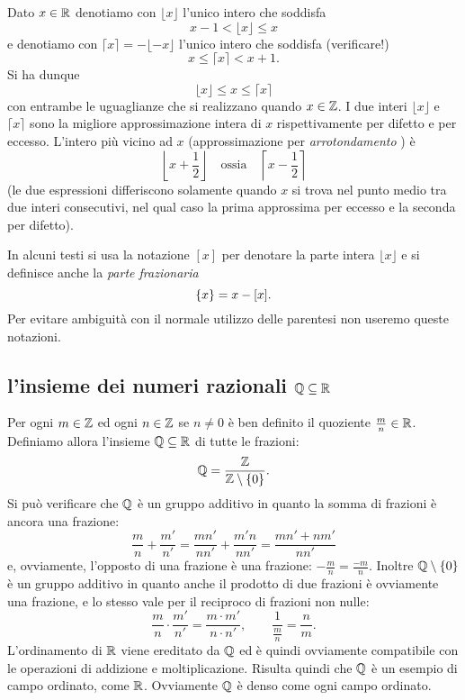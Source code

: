 \begin{definition}
  \mymark{**}%
%
  Dato $x\in {\mathbb R}$ denotiamo con $\lfloor x\rfloor$ l'unico intero
  che soddisfa
  \mymargin{$\lfloor\cdot\rfloor$} %
  \[
    x - 1 < \lfloor x \rfloor \le x
  \]
  e denotiamo con $\lceil x \rceil = - \lfloor -x \rfloor$ l'unico intero che soddisfa (verificare!)
  \mymargin{$\lceil\cdot\rceil$} %
  \[
    x \le \lceil x \rceil < x + 1.
  \]
  Si ha dunque
  \[
    \lfloor x \rfloor \le x \le \lceil x \rceil
  \]
  con entrambe le uguaglianze che si realizzano quando $x\in {\mathbb Z}$.
  I due interi $\lfloor x \rfloor$ e $\lceil x \rceil$
  sono la migliore approssimazione intera di $x$ rispettivamente
  per difetto e per eccesso.
  L'intero più vicino ad $x$ (approssimazione per \emph{arrotondamento}%
%
)
  è
  \[
    \left\lfloor x + \frac 1 2 \right\rfloor
  \quad \text{ossia} \quad
    \left\lceil x-\frac 1 2 \right\rceil
  \]
  (le due espressioni differiscono solamente quando $x$ si trova nel punto medio tra 
  due interi consecutivi, nel qual caso la prima approssima per eccesso e la seconda 
  per difetto).
\end{definition}

In alcuni testi si usa la notazione $[x]$ per denotare la parte intera $\lfloor x \rfloor$ e si definisce
anche la \emph{parte frazionaria}
\[
  {\left\{ x \right\}} = x - [x].
\]
Per evitare ambiguità con il normale utilizzo delle parentesi
non useremo queste notazioni.

\subsection{l'insieme dei numeri razionali ${\mathbb Q}\subseteq {\mathbb R}$}
%
%
%
%
\index{$\QQ$}%

Per ogni $m\in {\mathbb Z}$ ed ogni $n\in {\mathbb Z}$ se $n\neq 0$ è ben
definito il quoziente $\frac m n\in {\mathbb R}$.
Definiamo allora l'insieme ${\mathbb Q}\subseteq {\mathbb R}$ di tutte le frazioni:
\[
    {\mathbb Q} = \frac{{\mathbb Z}}{{\mathbb Z}\setminus{\left\{ 0 \right\}}}.
\]
Si può verificare che $\QQ$ è un gruppo additivo in quanto 
la somma di frazioni è ancora una frazione:
\[
  \frac{m}{n} + \frac{m'}{n'}
  = \frac{mn'}{nn'} + \frac{m'n}{nn'} 
  = \frac{mn'+nm'}{n n'}
\]
e, ovviamente, l'opposto di una frazione è una frazione: 
$- \frac m n = \frac{-m}{n}$. 
Inoltre ${\mathbb Q}\setminus {\left\{ 0 \right\}}$ è un gruppo 
additivo in quanto anche il prodotto di due frazioni 
è ovviamente una frazione, e lo stesso vale per il reciproco di frazioni 
non nulle:
\[
  \frac{m}{n}\cdot \frac{m'}{n'} = \frac{m\cdot m'}{n\cdot n'},
  \qquad
  \frac{1}{\frac m n} = \frac n m.  
\]
L'ordinamento di ${\mathbb R}$ viene ereditato da $\QQ$ ed è quindi ovviamente 
compatibile con le operazioni di addizione e moltiplicazione. 
Risulta quindi che $\QQ$ è un esempio di campo ordinato, come ${\mathbb R}$.
Ovviamente $\QQ$ è denso come ogni campo ordinato.

